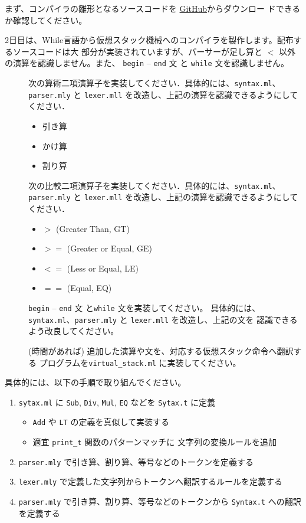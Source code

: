 \documentclass[a4paper,11pt]{jsarticle}
\begin{document}
まず、コンパイラの雛形となるソースコードを
\href{https://github.com/tmu-compiler-info-sys-exp-I/compiler-day2}{GitHub}からダウンロー
ドできるか確認してください。

2日目は、While言語から仮想スタック機械へのコンパイラを製作します。配布するソースコードは大
部分が実装されていますが、パーサーが足し算と $<$ 以外の演算を認識しません。また、
\verb|begin| -- \verb|end| 文 と \verb|while| 文を認識しません。

\begin{description}
\item [] 次の算術二項演算子を実装してください．具体的には、\verb|syntax.ml|、
  \verb|parser.mly| と \verb|lexer.mll| を改造し、上記の演算を認識できるようにしてください．
  \begin{itemize}
  \item 引き算
  \item かけ算
  \item 割り算
  \end{itemize}
\item [] 次の比較二項演算子を実装してください．具体的には、\verb|syntax.ml|、
  \verb|parser.mly| と \verb|lexer.mll| を改造し、上記の演算を認識できるようにしてください．
  \begin{itemize}
  \item $>$ (Greater Than, GT)
  \item $>=$ (Greater or Equal, GE)
  \item $<=$ (Less or Equal, LE)
  \item $==$ (Equal, EQ)
  \end{itemize}
\item [] \verb|begin| -- \verb|end| 文 と\verb|while| 文を実装してください。
  具体的には、\verb|syntax.ml|、\verb|parser.mly| と \verb|lexer.mll| を改造し、上記の文を
  認識できるよう改良してください。
\item [] (時間があれば) 追加した演算や文を、対応する仮想スタック命令へ翻訳する
  プログラムを\verb|virtual_stack.ml| に実装してください。
\end{description}

具体的には、以下の手順で取り組んでください。

\noindent{}

\begin{enumerate}
\item \verb|sytax.ml| に \verb|Sub|, \verb|Div|, \verb|Mul|, \verb|EQ| などを
  \verb|Sytax.t| に定義
  \begin{itemize}
  \item \verb|Add| や \verb|LT| の定義を真似して実装する
  \item 適宜 \verb|print_t| 関数のパターンマッチに 文字列の変換ルールを追加
  \end{itemize}
\item \verb|parser.mly| で引き算、割り算、等号などのトークンを定義する
\item \verb|lexer.mly| で定義した文字列からトークンへ翻訳するルールを定義する
\item \verb|parser.mly| で引き算、割り算、等号などのトークンから \verb|Syntax.t| への翻訳
  を定義する
\end{enumerate}
\end{document}
